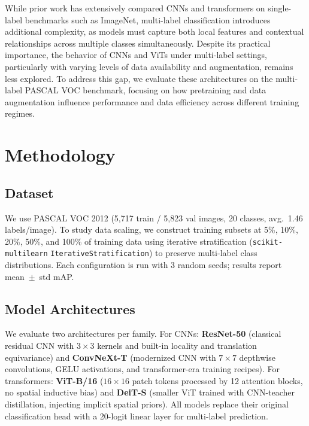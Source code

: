\documentclass{article}
\begin{document}
While prior work has extensively compared CNNs and transformers on single-label benchmarks such as ImageNet, multi-label classification introduces additional complexity, as models must capture both local features and contextual relationships across multiple classes simultaneously. Despite its practical importance, the behavior of CNNs and ViTs under multi-label settings, particularly with varying levels of data availability and augmentation, remains less explored. To address this gap, we evaluate these architectures on the multi-label PASCAL VOC benchmark, focusing on how pretraining and data augmentation influence performance and data efficiency across different training regimes.


\section{Methodology}

\subsection{Dataset}

We use PASCAL VOC 2012 (5,717 train / 5,823 val images, 20 classes, avg.\ 1.46 labels/image). To study data scaling, we construct training subsets at 5\%, 10\%, 20\%, 50\%, and 100\% of training data using iterative stratification (\texttt{scikit-multilearn} \texttt{IterativeStratification}) to preserve multi-label class distributions. Each configuration is run with 3 random seeds; results report mean~$\pm$~std mAP.

\subsection{Model Architectures}

We evaluate two architectures per family. For CNNs: \textbf{ResNet-50} (classical residual CNN with $3 \times 3$ kernels and built-in locality and translation equivariance) and \textbf{ConvNeXt-T} (modernized CNN with $7 \times 7$ depthwise convolutions, GELU activations, and transformer-era training recipes). For transformers: \textbf{ViT-B/16} ($16 \times 16$ patch tokens processed by 12 attention blocks, no spatial inductive bias) and \textbf{DeiT-S} (smaller ViT trained with CNN-teacher distillation, injecting implicit spatial priors). All models replace their original classification head with a 20-logit linear layer for multi-label prediction.
\end{document}
